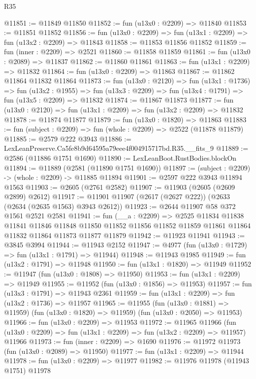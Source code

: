 \begin{lexlean}{R35}
\begin{coremodule}
@11851 := @11849 @11850
@11852 := fun (u13x0 : @2209) => @11840
@11853 := @11851 @11852
@11856 := fun (u13x0 : @2209) => fun (u13x1 : @2209) => fun (u13x2 : @2209) => @11843
@11858 := @11853 @11856 @11852
@11859 := fun (inner : @2209) => @2521
@11860 := @11858 @11859
@11861 := fun (u13x0 : @2089) => @11837
@11862 := @11860 @11861
@11863 := fun (u13x1 : @2209) => @11832
@11864 := fun (u13x0 : @2209) => @11863
@11867 := @11862 @11864 @11832 @11864
@11873 := fun (u13x0 : @2120) =>
  fun (u13x1 : @1736) =>
  fun (u13x2 : @1955) => fun (u13x3 : @2209) => fun (u13x4 : @1791) => fun (u13x5 : @2209) => @11832
@11874 := @11867 @11873
@11877 := fun (u13x0 : @2120) => fun (u13x1 : @2209) => fun (u13x2 : @2209) => @11832
@11878 := @11874 @11877
@11879 := fun (u13x0 : @1820) => @11863
@11883 := fun (subject : @2209) => fun (whole : @2209) => @2522 (@11878 @11879)
@11885 := @2579 @222 @3943
@11886 := LexLeanPreserve.Ca5fe8b9d64595a79eee4f004915717bd.R35.__fits_9
@11889 := @2586 (@11886 @1751 @1690)
@11890 := LexLeanBoot.RustBodies.blockOn
@11894 := @11889 (@2581 (@11890 @1751 @1690))
@11897 := (subject : @2209) -> (whole : @2209) -> @11885 @11894
@11901 := @2597 @222 @3943 @11894 @1563
@11903 := @2605 (@2761 @2582)
@11907 := @11903 (@2605 (@2609 @2899) @2612)
@11917 := @11901 @11907 (@2617 (@2627 @222)) (@2633 (@2634 (@2635 @1563) @3943 @2612))
@11923 := @2644 @11907 @58 @372 @1561 @2521 @2581
@11941 := fun (__a : @2209) =>
  @2525
    @11834
    @11838
    @11841
    @11846
    @11848
    @11850
    @11852
    @11856
    @11852
    @11859
    @11861
    @11864
    @11832
    @11864
    @11873
    @11877
    @11879
@11942 := @11923 @11941
@11943 := @3845 @3994
@11944 := @11943 @2152
@11947 := @4977 (fun (u13x0 : @1729) => fun (u13x1 : @1791) => @11944)
@11948 := @11943 @1985
@11949 := fun (u13x2 : @1791) => @11948
@11950 := fun (u13x1 : @1820) => @11949
@11952 := @11947 (fun (u13x0 : @1808) => @11950)
@11953 := fun (u13x1 : @2209) => @11949
@11955 := @11952 (fun (u13x0 : @1856) => @11953)
@11957 := fun (u13x3 : @1791) => @11943 @2361
@11959 := fun (u13x1 : @2209) => fun (u13x2 : @1736) => @11957
@11965 := @11955
    (fun (u13x0 : @1881) => @11959)
    (fun (u13x0 : @1820) => @11959)
    (fun (u13x0 : @2050) => @11953)
@11966 := fun (u13x0 : @2209) => @11953
@11972 := @11965
    @11966
    (fun (u13x0 : @2209) => fun (u13x1 : @2209) => fun (u13x2 : @2209) => @11957)
    @11966
@11973 := fun (inner : @2209) => @1690
@11976 := @11972 @11973 (fun (u13x0 : @2089) => @11950)
@11977 := fun (u13x1 : @2209) => @11944
@11978 := fun (u13x0 : @2209) => @11977
@11982 := @11976 @11978 (@11943 @1751) @11978

\end{coremodule}
\end{lexlean}
